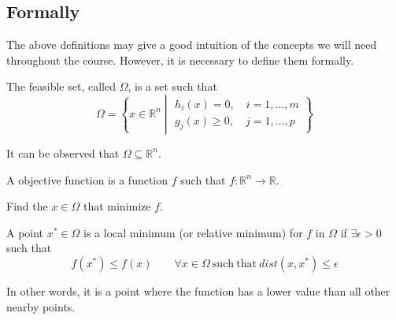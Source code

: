 \subsection{Formally}
\label{sec:introduction.modeling.formally}

The above definitions may give a good intuition of the concepts we will need throughout the course. However, it is necessary to define them formally.

\begin{definition}
    The feasible set, called \( \Omega \), is a set such that
    \[ 
        \Omega = \left\{ 
            x \in \mathbb{R}^n   
            \middle\vert
            \begin{array}{l}
                h_i(x) = 0, \quad i = 1, ..., m \\
                g_j(x) \geq 0, \quad j = 1, ..., p
            \end{array}
        \right\}
    \]
\end{definition}
\vspace{-1em}
It can be observed that \( \Omega \subseteq \mathbb{R}^n \).

\begin{definition}
    A objective function is a function \( f \) such that \( f : \mathbb{R}^n \rightarrow \mathbb{R} \).
\end{definition}

\begin{definition}
    Find the \( x \in \Omega \) that minimize \( f \).
\end{definition}

\begin{definition}
    A point \( x^* \in \Omega \) is a local minimum (or relative minimum) for \( f \) in \( \Omega \) if \( \exists \epsilon > 0 \) such that
    \[
        f(x^*) \leq f(x) \qquad \forall x \in \Omega \mathrm{~such~that~} \mathit{dist}(x, x^*) \leq \epsilon
    \]
\end{definition}

In other words, it is a point where the function has a lower value than all other nearby points.


